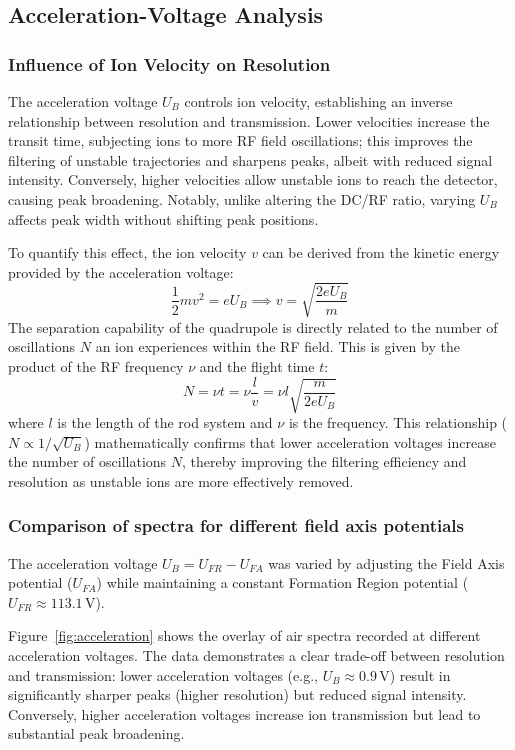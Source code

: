 \documentclass[a4paper]{article}
\begin{document}
\subsection{Acceleration-Voltage Analysis}
\subsubsection{Influence of Ion Velocity on Resolution}
The acceleration voltage $U_B$ controls ion velocity, establishing an inverse relationship between resolution and transmission. Lower velocities increase the transit time, subjecting ions to more RF field oscillations; this improves the filtering of unstable trajectories and sharpens peaks, albeit with reduced signal intensity. Conversely, higher velocities allow unstable ions to reach the detector, causing peak broadening. Notably, unlike altering the DC/RF ratio, varying $U_B$ affects peak width without shifting peak positions.

To quantify this effect, the ion velocity $v$ can be derived from the kinetic energy provided by the acceleration voltage:
\begin{equation}
  \frac{1}{2}mv^2 = e U_B \implies v = \sqrt{\frac{2e U_B}{m}}
\end{equation}
The separation capability of the quadrupole is directly related to the number of oscillations $N$ an ion experiences within the RF field. This is given by the product of the RF frequency $\nu$ and the flight time $t$:
\begin{equation}
  N = \nu t = \nu \frac{l}{v} = \nu l \sqrt{\frac{m}{2e U_B}}
\end{equation}
where $l$ is the length of the rod system and $\nu$ is the frequency\cite{QMSAnleitung}. This relationship ($N \propto 1/\sqrt{U_B}$) mathematically confirms that lower acceleration voltages increase the number of oscillations $N$, thereby improving the filtering efficiency and resolution as unstable ions are more effectively removed.

\subsubsection{Comparison of spectra for different field axis potentials}
The acceleration voltage $U_B = U_{FR} - U_{FA}$ was varied by adjusting the Field Axis potential ($U_{FA}$) while maintaining a constant Formation Region potential ($U_{FR} \approx 113.1$\,V).

Figure~\ref{fig:acceleration} shows the overlay of air spectra recorded at different acceleration voltages. The data demonstrates a clear trade-off between resolution and transmission: lower acceleration voltages (e.g., $U_B \approx 0.9$\,V) result in significantly sharper peaks (higher resolution) but reduced signal intensity. Conversely, higher acceleration voltages increase ion transmission but lead to substantial peak broadening.
\end{document}
